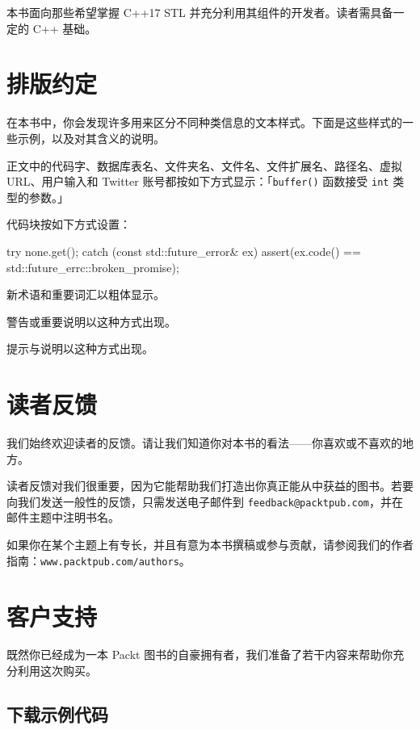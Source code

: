 本书面向那些希望掌握 C++17 STL 并充分利用其组件的开发者。读者需具备一定的 C++ 基础。

\section{排版约定}

在本书中，你会发现许多用来区分不同种类信息的文本样式。下面是这些样式的一些示例，以及对其含义的说明。

正文中的代码字、数据库表名、文件夹名、文件名、文件扩展名、路径名、虚拟 URL、用户输入和 Twitter 账号都按如下方式显示：「\texttt{buffer(\allowbreak{})\allowbreak{}} 函数接受 \texttt{int} 类型的参数。」

代码块按如下方式设置：

\begin{codebox}[cpp]
    try {
      none.get();
    } catch (const std::future_error& ex) {
      assert(ex.code() == std::future_errc::broken_promise);
    }
\end{codebox}

新术语和重要词汇以粗体显示。

警告或重要说明以这种方式出现。

提示与说明以这种方式出现。

\section{读者反馈}

我们始终欢迎读者的反馈。请让我们知道你对本书的看法——你喜欢或不喜欢的地方。

读者反馈对我们很重要，因为它能帮助我们打造出你真正能从中获益的图书。若要向我们发送一般性的反馈，只需发送电子邮件到 \texttt{feedback@packtpub.\allowbreak{}com}，并在邮件主题中注明书名。

如果你在某个主题上有专长，并且有意为本书撰稿或参与贡献，请参阅我们的作者指南：\texttt{www.\allowbreak{}packtpub.\allowbreak{}com/\allowbreak{}authors}。

\section{客户支持}

既然你已经成为一本 Packt 图书的自豪拥有者，我们准备了若干内容来帮助你充分利用这次购买。

\subsection{下载示例代码}

